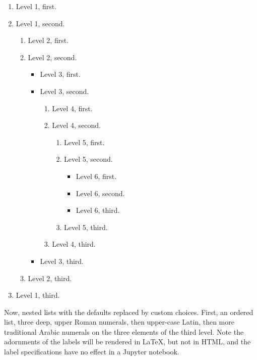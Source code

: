 \documentclass[10pt,]{article}
\theoremstyle{plain}
\theoremstyle{definition}
\theoremstyle{definition}
\theoremstyle{definition}
\theoremstyle{definition}
\theoremstyle{definition}
\theoremstyle{definition}
\numberwithin{equation}{section}
\begin{document}
\begin{enumerate}
\item\hypertarget{li-80}{}\hypertarget{p-349}{}%
Level 1, first.%
\item\hypertarget{li-81}{}\hypertarget{p-350}{}%
Level 1, second.%
\begin{enumerate}
\item\hypertarget{li-82}{}\hypertarget{p-351}{}%
Level 2, first.%
\item\hypertarget{li-83}{}\hypertarget{p-352}{}%
Level 2, second.%
\begin{itemize}[label=\textbullet]
\item{}\hypertarget{p-353}{}%
Level 3, first.%
\item{}\hypertarget{p-354}{}%
Level 3, second.%
\begin{enumerate}
\item\hypertarget{li-86}{}\hypertarget{p-355}{}%
Level 4, first.%
\item\hypertarget{li-87}{}\hypertarget{p-356}{}%
Level 4, second.%
\begin{enumerate}
\item\hypertarget{li-88}{}\hypertarget{p-357}{}%
Level 5, first.%
\item\hypertarget{li-89}{}\hypertarget{p-358}{}%
Level 5, second.%
\begin{itemize}[label=$\circ$]
\item{}\hypertarget{p-359}{}%
Level 6, first.%
\item{}\hypertarget{p-360}{}%
Level 6, second.%
\item{}\hypertarget{p-361}{}%
Level 6, third.%
\end{itemize}
%
\item\hypertarget{li-93}{}\hypertarget{p-362}{}%
Level 5, third.%
\end{enumerate}
%
\item\hypertarget{li-94}{}\hypertarget{p-363}{}%
Level 4, third.%
\end{enumerate}
%
\item{}\hypertarget{p-364}{}%
Level 3, third.%
\end{itemize}
%
\item\hypertarget{li-96}{}\hypertarget{p-365}{}%
Level 2, third.%
\end{enumerate}
%
\item\hypertarget{li-97}{}\hypertarget{p-366}{}%
Level 1, third.%
\end{enumerate}
%
\par
\hypertarget{p-367}{}%
Now, nested lists with the defaults replaced by custom choices.  First, an ordered list, three deep, upper Roman numerals, then upper-case Latin, then more traditional Arabic numerals on the three elements of the third level.  Note the adornments of the labels will be rendered in LaTeX, but not in HTML, and the label specifications have no effect in a Jupyter notebook.\leavevmode%
\end{document}
